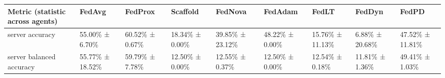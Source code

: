\begin{tabular}{lllllllll}
\hline
 Metric (statistic across agents)   & FedAvg          & FedProx        & Scaffold       & FedNova         & FedAdam        & FedLT           & FedDyn         & FedPD           \\
\hline
 server accuracy                    & 55.00\% ± 6.70\%  & 60.52\% ± 0.67\% & 18.34\% ± 0.00\% & 39.85\% ± 23.12\% & 48.22\% ± 0.00\% & 15.76\% ± 11.13\% & 6.88\% ± 20.68\% & 47.52\% ± 11.81\% \\
 server balanced accuracy           & 55.77\% ± 18.52\% & 59.79\% ± 7.78\% & 12.50\% ± 0.00\% & 12.55\% ± 0.37\%  & 12.50\% ± 0.00\% & 12.54\% ± 0.18\%  & 11.81\% ± 1.36\% & 49.41\% ± 1.03\%  \\
\hline
\end{tabular}